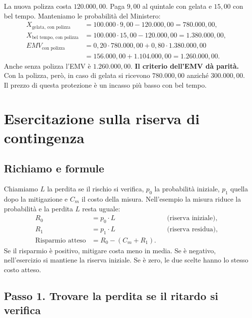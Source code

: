 \noindent La nuova polizza costa $120.000{,}00$. Paga $9{,}00$
al quintale con gelata e $15{,}00$ con bel tempo.
Manteniamo le probabilità del Ministero:
\begin{align*}
    X_{\text{gelata, con polizza}}
        &= 100.000 \cdot 9{,}00 - 120.000{,}00 = 780.000{,}00, \\
    X_{\text{bel tempo, con polizza}}
        &= 100.000 \cdot 15{,}00 - 120.000{,}00 = 1.380.000{,}00, \\
    EMV_{\text{con polizza}}
        &= 0{,}20 \cdot 780.000{,}00 + 0{,}80 \cdot 1.380.000{,}00 \\
        &= 156.000{,}00 + 1.104.000{,}00 = 1.260.000{,}00.
\end{align*}
\noindent Anche senza polizza l'EMV è $1.260.000{,}00$.
\textbf{Il criterio dell'EMV dà parità.} Con la polizza, però,
in caso di gelata si ricevono $780.000{,}00$ anziché $300.000{,}00$.
Il prezzo di questa protezione è un incasso più basso con bel tempo.

\section{Esercitazione sulla riserva di contingenza}

\subsection*{Richiamo e formule}

\noindent Chiamiamo $L$ la perdita se il rischio si verifica,
$p_0$ la probabilità iniziale, $p_1$ quella dopo la mitigazione
e $C_m$ il costo della misura. Nell'esempio la misura riduce
la probabilità e la perdita $L$ resta uguale:
\begin{align*}
    R_0 &= p_0 \cdot L
        && \text{(riserva iniziale)}, \\
    R_1 &= p_1 \cdot L
        && \text{(riserva residua)}, \\
    \text{Risparmio atteso} &= R_0 - (C_m + R_1).
\end{align*}
\noindent Se il risparmio è positivo, mitigare costa meno in media.
Se è negativo, nell'esercizio si mantiene la riserva iniziale.
Se è zero, le due scelte hanno lo stesso costo atteso.

\subsection*{Passo 1. Trovare la perdita se il ritardo si verifica}

